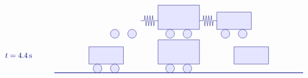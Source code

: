 \begin{solution}
\begin{itemize}
\begin{equation*}
\begin{tikzpicture}[scale=0.8, color=blue!50!black]
\begin{scope}[yshift=-6cm]
\begin{scope}[xshift=1cm]
            \draw[fill=blue!10] (2.5,0.25) circle (0.25);
            \draw[fill=blue!10] (3.5,0.25) circle (0.25);
          \end{scope}
          \begin{scope}[xshift=4.2cm]
            \draw[fill=blue!10] (1.8,0.5) rectangle (4.2,1.9);
            \draw[fill=blue!10] (2.5,0.25) circle (0.25);
            \draw[fill=blue!10] (3.5,0.25) circle (0.25);
          \end{scope}
          \begin{scope}[xshift=7.4cm]
            \draw[fill=blue!10] (2,0.5) rectangle (4,1.5);
            \draw[fill=blue!10] (2.5,0.25) circle (0.25);
            \draw[fill=blue!10] (3.5,0.25) circle (0.25);
          \end{scope}
          \begin{scope}[xshift=5cm]
            \draw (0,1) -- ++(0.2,0) -- ++(0.0375,0.3)
            -- ++(0.075,-0.6) -- ++(0.075,0.6)
            -- ++(0.075,-0.6) -- ++(0.075,0.6)
            -- ++(0.075,-0.6) -- ++(0.075,0.6)
            -- ++(0.075,-0.6) -- ++(0.0375,0.3)
            -- ++(0.2,0);
          \end{scope}
          \begin{scope}[xshift=8.4cm]
            \draw (0,1) -- ++(0.2,0) -- ++(0.0375,0.3)
            -- ++(0.075,-0.6) -- ++(0.075,0.6)
            -- ++(0.075,-0.6) -- ++(0.075,0.6)
            -- ++(0.075,-0.6) -- ++(0.075,0.6)
            -- ++(0.075,-0.6) -- ++(0.0375,0.3)
            -- ++(0.2,0);
          \end{scope}
        \end{scope}
        \begin{scope}[yshift=-8cm]
          \draw (-3,1) node[right] {$t=4.4\s$};
          \draw[thick] (0,0) -- (14.4,0);
          \begin{scope}[xshift=0cm]
            \draw[fill=blue!10] (2,0.5) rectangle (4,1.5);
            \draw[fill=blue!10] (2.5,0.25) circle (0.25);
            \draw[fill=blue!10] (3.5,0.25) circle (0.25);
          \end{scope}
          \begin{scope}[xshift=4.2cm]
            \draw[fill=blue!10] (1.8,0.5) rectangle (4.2,1.9);
            \draw[fill=blue!10] (2.5,0.25) circle (0.25);
            \draw[fill=blue!10] (3.5,0.25) circle (0.25);
          \end{scope}
          \begin{scope}[xshift=8.4cm]
            \draw[fill=blue!10] (2,0.5) rectangle (4,1.5);

\end{scope}
\end{scope}
\end{tikzpicture}
\end{equation*}
\end{itemize}
\end{solution}
